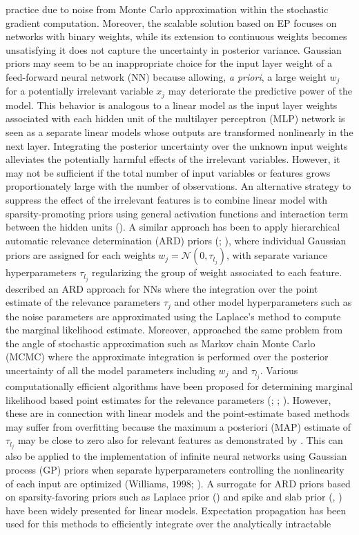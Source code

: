 \documentclass[]{article}
\begin{document}
practice due to noise from Monte Carlo approximation within the stochastic gradient computation. Moreover, the scalable solution based on EP focuses on networks with binary weights, while its extension to continuous weights becomes unsatisfying it does not capture the uncertainty in posterior variance. Gaussian priors may seem to be an inappropriate choice for the input layer weight of a feed-forward neural network (NN) because allowing, \textit{a priori}, a large weight $w_j$ for a potentially irrelevant variable $x_j$ may deteriorate the predictive power of the model. This behavior is analogous to a linear model as the input layer weights associated with each hidden unit of the multilayer perceptron (MLP) network is seen as a separate linear models whose outputs are transformed nonlinearly in the next layer. Integrating the posterior uncertainty over the unknown input weights alleviates the potentially harmful effects of the irrelevant variables. However, it may not be sufficient if the total number of input variables or features grows proportionately large with the number of observations. An alternative strategy to suppress the effect of the irrelevant features is to combine linear model with sparsity-promoting priors using general activation functions and interaction term between the hidden units (\cite{Jylankietal2014}). A similar approach has been to apply hierarchical automatic relevance determination (ARD) priors (\cite{mackay1992c}; \cite{neal1996}), where individual Gaussian priors are assigned for each weights $w_j = \mathcal{N}(0,\tau_{l_j})$, with separate variance hyperparameters $\tau_{l_j}$ regularizing the group of weight associated to each feature. \cite{mackay1995a} described an ARD approach for NNs where the integration over the point estimate of the relevance parameters $\tau_{j}$ and other model hyperparameters such as the noise parameters are approximated using the Laplace's method to compute the marginal likelihood estimate. Moreover, \cite{neal1996} approached the same problem from the angle of stochastic approximation such as  Markov chain Monte Carlo (MCMC) where the approximate integration is performed over the posterior uncertainty of all the model parameters including $w_j$ and $\tau_{l_j}$. Various computationally efficient algorithms have been proposed for determining marginal likelihood based point estimates for the relevance parameters (\cite{tipping2001}; \cite{qietal2004}; \cite{wipfandnagarajan2008}). However, these are in connection with linear models and the point-estimate based methods may suffer from overfitting because the maximum a posteriori (MAP) estimate of $\tau_{l_j}$ may be close to zero also for relevant features as demonstrated by \cite{qietal2004}. This can also be applied to the implementation of infinite neural networks using Gaussian process (GP) priors when separate hyperparameters controlling the nonlinearity of each input are optimized (Williams, $1998$; \cite{rasmussenandwilliams2006}). A surrogate for ARD priors based on sparsity-favoring priors such as Laplace prior (\cite{seeger2008pro}) and spike and slab prior (\cite{joseetal2008}, \cite{jose2010}) have been widely presented for linear models. Expectation propagation has been used for this methods to efficiently integrate over the analytically intractable 
\end{document}
